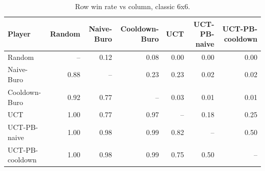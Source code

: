 \begin{table}[H]
\centering
\small
\begin{tabular}{lrrrrrr}
\toprule
Player & Random & Naive-Buro & Cooldown-Buro & UCT & UCT-PB-naive & UCT-PB-cooldown \\
\midrule
Random & -- & 0.12 & 0.08 & 0.00 & 0.00 & 0.00 \\
Naive-Buro & 0.88 & -- & 0.23 & 0.23 & 0.02 & 0.02 \\
Cooldown-Buro & 0.92 & 0.77 & -- & 0.03 & 0.01 & 0.01 \\
UCT & 1.00 & 0.77 & 0.97 & -- & 0.18 & 0.25 \\
UCT-PB-naive & 1.00 & 0.98 & 0.99 & 0.82 & -- & 0.50 \\
UCT-PB-cooldown & 1.00 & 0.98 & 0.99 & 0.75 & 0.50 & -- \\
\bottomrule
\end{tabular}
\caption{Row win rate vs column, classic 6x6.}
\label{tab:winrate_classic}
\end{table}